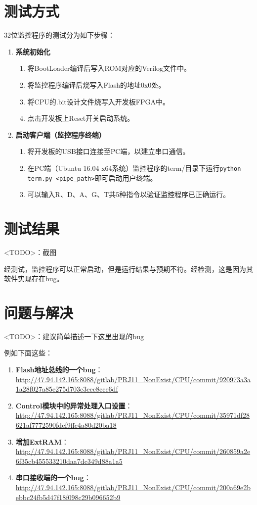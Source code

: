 \section{测试方式}

32位监控程序的测试分为如下步骤：

\begin{enumerate}
    \item {\bf 系统初始化}

    \begin{enumerate}
        \item 将BootLoader编译后写入ROM对应的Verilog文件中。
        \item 将监控程序编译后烧写入Flash的地址0x0处。
        \item 将CPU的.bit设计文件烧写入开发板FPGA中。
        \item 点击开发板上Reset开关启动系统。
    \end{enumerate}

    \item {\bf 启动客户端（监控程序终端）}

    \begin{enumerate}
        \item 将开发板的USB接口连接至PC端，以建立串口通信。
        \item 在PC端（Ubuntu 16.04 x64系统）监控程序的term/目录下运行\texttt{python term.py <pipe\_path>}即可启动用户终端。
        \item 可以输入R、D、A、G、T共5种指令以验证监控程序已正确运行。
    \end{enumerate}

\end{enumerate}

\section{测试结果}

<TODO>：截图

经测试，监控程序可以正常启动，但是运行结果与预期不符。经检测，这是因为其软件实现存在bug。

\section{问题与解决}

<TODO>：建议简单描述一下这里出现的bug

例如下面这些：

\begin{enumerate}
    \item {\bf Flash地址总线的一个bug}：\url{http://47.94.142.165:8088/gitlab/PRJ11_NonExist/CPU/commit/920973a3a1a28f027a85e275d703c3eec8cce6df}
    \item {\bf Control模块中的异常处理入口设置}：\url{http://47.94.142.165:8088/gitlab/PRJ11_NonExist/CPU/commit/35971df28621af7772590fdef9ffc4a80d20ba18}
    \item {\bf 增加ExtRAM}：\url{http://47.94.142.165:8088/gitlab/PRJ11_NonExist/CPU/commit/260859a2e6f35cb455533210daa7dc349d88a1a5}
    \item {\bf 串口接收端的一个bug}：\url{http://47.94.142.165:8088/gitlab/PRJ11_NonExist/CPU/commit/200a69e2bebbc24fb5d47f18f098c29b096652b9}
\end{enumerate}
